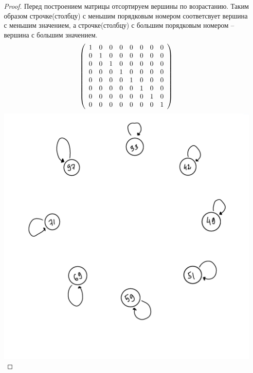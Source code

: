 \begin{proof}
Перед построением матрицы отсортируем вершины по возрастанию. Таким образом строчке(столбцу) с меньшим порядковым номером соответсвует вершина с меньшим значением, а строчке(столбцу) с большим порядковым номером -- вершина с большим значением.
	$$ \left( \begin{array}{c c c c c c c c } 
 
 1 & 0 & 0 & 0 & 0 & 0 & 0 & 0 \\ 

 0 & 1 & 0 & 0 & 0 & 0 & 0 & 0 \\

 0 & 0 & 1 & 0 & 0 & 0 & 0 & 0 \\
 
 0 & 0 & 0 & 1 & 0 & 0 & 0 & 0 \\
 
 0 & 0 & 0 & 0 & 1 & 0 & 0 & 0 \\
 
 0 & 0 & 0 & 0 & 0 & 1 & 0 & 0 \\
 
 0 & 0 & 0 & 0 & 0 & 0 & 1 & 0 \\
 
 0 & 0 & 0 & 0 & 0 & 0 & 0 & 1 \end {array} \right) $$
 \includegraphics{граф3.png}
\end{proof}

